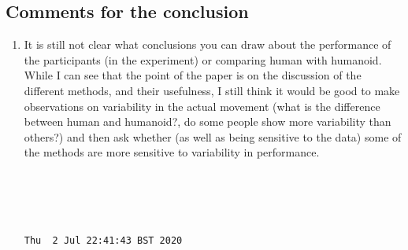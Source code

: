 \documentclass[10pt]{article}
\begin{document}
\subsection{Comments for the conclusion}


\begin{enumerate}

\item 

It is still not clear what conclusions you can draw about the 
performance of the participants (in the experiment) or 
comparing human with humanoid. While I can see that the point 
of the paper is on the discussion of the different methods, 
and their usefulness, 
I still think it would be good 
to make observations on variability in the actual 
movement (what is the difference between human and humanoid?, 
do some people show more variability than others?) 
and then ask whether (as well as being sensitive to the data) 
some of the methods are more sensitive to variability 
in performance.
	\begin{verbatim}




Thu  2 Jul 22:41:43 BST 2020

\end{verbatim}
\end{enumerate}
\end{document}
